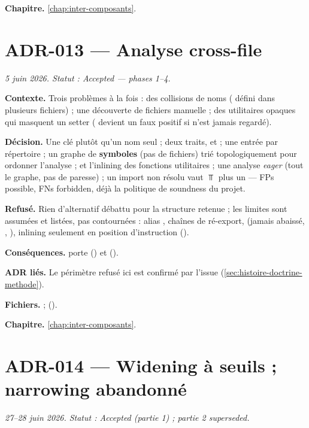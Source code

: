 \textbf{Chapitre.} \cref{chap:inter-composants}.

\section{ADR-013 --- Analyse cross-file}
\label{adr:13}
\noindent\textit{5 juin 2026. Statut : Accepted --- phases 1--4.}

\textbf{Contexte.} Trois problèmes à la fois : des collisions de noms
( défini dans plusieurs fichiers) ; une découverte de fichiers
manuelle ; des utilitaires opaques qui masquent un setter (
devient un faux positif si  n'est jamais regardé).

\textbf{Décision.} Une clé  plutôt qu'un nom seul ;
deux traits,  et  ; une entrée par
répertoire ; un graphe de \textbf{symboles} (pas de fichiers) trié
topologiquement pour ordonner l'analyse ;  et l'inlining des
fonctions utilitaires ; une analyse \emph{eager} (tout le graphe, pas de
paresse) ; un import non résolu vaut $\Top$ plus un \Info{} --- \og FPs
possible, FNs forbidden\fg{}, déjà la politique de soundness du projet.

\textbf{Refusé.} Rien d'alternatif débattu pour la structure retenue ; les
limites sont assumées et listées, pas contournées : alias ,
chaînes de ré-export,  (jamais abaissé, ,
), inlining seulement en position d'instruction ().

\textbf{Conséquences.}  porte 
() et 
().

\textbf{ADR liés.} Le périmètre  refusé ici est confirmé
 par l'issue  (\cref{sec:histoire-doctrine-methode}).

\textbf{Fichiers.}  ; 
().

\textbf{Chapitre.} \cref{chap:inter-composants}.

\section{ADR-014 --- Widening à seuils ; narrowing abandonné}
\label{adr:14}
\noindent\textit{27--28 juin 2026. Statut : Accepted (partie 1) ; partie 2 superseded.}

